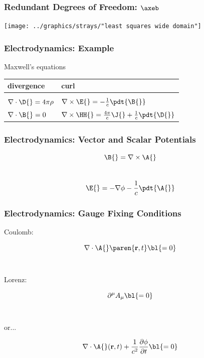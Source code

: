 \documentclass[handout]{beamer}
\begin{document}
\begin{frame}
  \frametitle{Redundant Degrees of Freedom: $\axeb$}  %
  \begin{center}
    \texttt{[image: ../graphics/strays/"least squares wide domain"]}
  \end{center}
\end{frame}


\begin{frame}      %
\frametitle{Electrodynamics: Example}
  Maxwell's equations \\
\begin{table}[htdp]
  \begin{center}
    \begin{tabular}{ll}
      divergence & curl \\\hline
      \\
      $\nabla \cdot \D{} = 4 \pi \rho$ &
      $\nabla \times \E{} = - \frac{1}{c} \pdt{\B{}}$ \\[10pt]
      $\nabla \cdot \B{} = 0$ &
      $\nabla \times \HH{} = \frac{4\pi}{c} \J{} + \frac{1}{c} \pdt{\D{}}$
    \end{tabular}
  \end{center}
\end{table}%
\end{frame}

\begin{frame}
  \frametitle{Electrodynamics: Vector and Scalar Potentials}  %
  $$\B{} = \nabla \times \A{}$$\\[20pt]
  $$\E{} = - \nabla \phi - \frac{1}{c} \pdt{\A{}}$$
\end{frame}

\begin{frame}      %
\frametitle{Electrodynamics: Gauge Fixing Conditions}
  \begin{center}
  Coulomb:
  \end{center}
  $$ \nabla \cdot \A{}\paren{\mathbf{r}, t} \bl{ = 0}$$ \\[20pt]
  \begin{center}
  Lorenz:
  \end{center}
  $$ \partial^{\mu} A_{\mu} \bl{ = 0}$$ \\
  \begin{center}
     or...
  \end{center}
  $$ \nabla \cdot {\A{}}({\bf{r}}, t) + \frac{1}{c^{2}} \frac{\partial \phi}{\partial t} \bl{= 0}$$
\end{frame}
\end{document}
